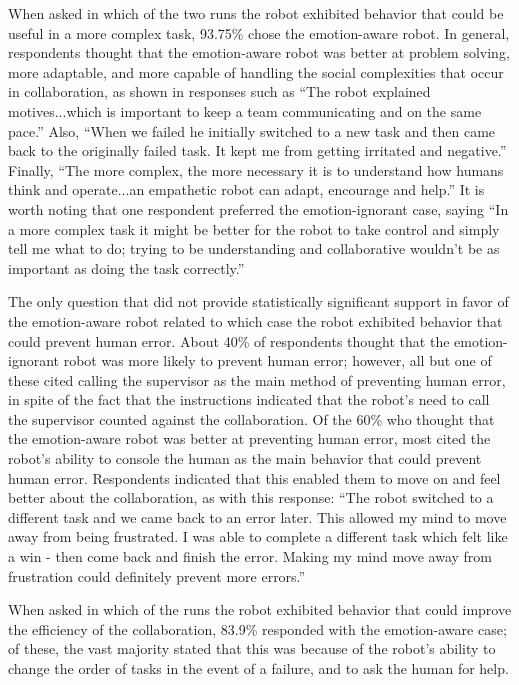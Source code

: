 \documentclass{sig-alternate-05-2015}
\begin{document}
When asked in which of the two runs the robot exhibited
behavior that could be useful in a more complex task, 93.75\% chose the
emotion-aware robot. In general, respondents thought that the emotion-aware
robot was better at problem solving, more adaptable, and more capable of
handling the social complexities that occur in collaboration, as shown in
responses such as ``The robot explained motives...which is important to keep a
team communicating and on the same pace.'' Also, ``When we failed he initially
switched to a new task and then came back to the originally failed task. It kept
me from getting irritated and negative.'' Finally, ``The more complex, the more
necessary it is to understand how humans think and operate...an empathetic robot
can adapt, encourage and help.'' It is worth noting that one respondent
preferred the emotion-ignorant case, saying ``In a more complex task it might be
better for the robot to take control and simply tell me what to do; trying to be
understanding and collaborative wouldn't be as important as doing the task
correctly.'' 

The only question that did not provide statistically significant support in
favor of the emotion-aware robot related to which case the robot exhibited
behavior that could prevent human error. About 40\% of respondents thought that
the emotion-ignorant robot was more likely to prevent human error; however, all
but one of these cited calling the supervisor as the main method of preventing
human error, in spite of the fact that the instructions indicated that the
robot's need to call the supervisor counted against the collaboration. Of the
60\% who thought that the emotion-aware robot was better at preventing human
error, most cited the robot's ability to console the human as the main behavior
that could prevent human error. Respondents indicated that this enabled them to
move on and feel better about the collaboration, as with this response: ``The
robot switched to a different task and we came back to an error later. This
allowed my mind to move away from being frustrated. I was able to complete a
different task which felt like a win - then come back and finish the error.
Making my mind move away from frustration could definitely prevent more
errors.''

When asked in which of the runs the robot exhibited behavior that could improve
the efficiency of the collaboration, 83.9\% responded with the emotion-aware
case; of these, the vast majority stated that this was because of the robot's
ability to change the order of tasks in the event of a failure, and to ask the
human for help.
\end{document}
